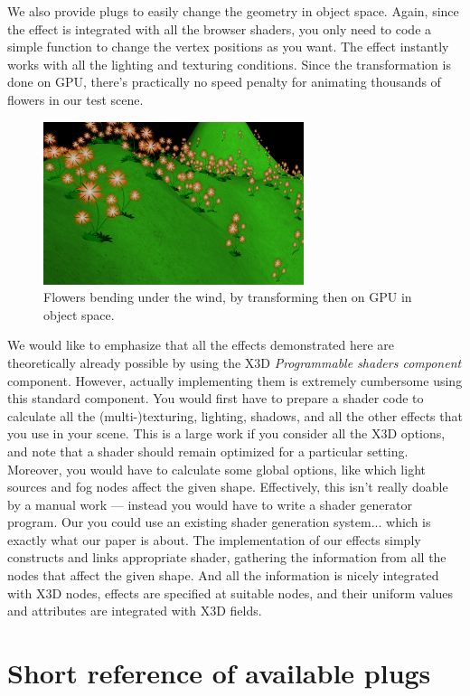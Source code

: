 \documentclass{acmsiggraph}                     %
\begin{document}
We also provide plugs to easily change the geometry in object space.
Again, since the effect is integrated with all the browser shaders,
you only need to code a simple function to change the vertex positions
as you want. The effect instantly works with all the lighting and texturing
conditions. Since the transformation is done on GPU, there's practically
no speed penalty for animating thousands of flowers in our test scene.

\begin{figure}[H]
  \centering
  \includegraphics[width=3in]{flowers}
  \caption{Flowers bending under the wind, by transforming then on GPU in object space.}
\end{figure}

We would like to emphasize that all the effects demonstrated here
are theoretically already possible by using the X3D \textit{Programmable
shaders component} component.
However, actually implementing them is extremely cumbersome using this
standard component. You would first
have to prepare a shader code to calculate all the (multi-)texturing, lighting,
shadows, and all the other effects that you use in your scene.
This is a large work if you consider all the X3D options, and note that
a shader should remain optimized for a particular setting.
Moreover, you would have to calculate some global options,
like which light sources and fog nodes affect the given shape.
Effectively, this isn't really doable by a manual work --- instead
you would have to write a shader generator program. Our you could use
an existing shader generation system... which is exactly what our paper
is about. The implementation of our effects simply constructs and links
appropriate shader, gathering the information from all the nodes
that affect the given shape. And all the information is nicely integrated
with X3D nodes, effects are specified at suitable nodes, and their
uniform values and attributes are integrated with X3D fields.

\section{Short reference of available plugs}
\end{document}
